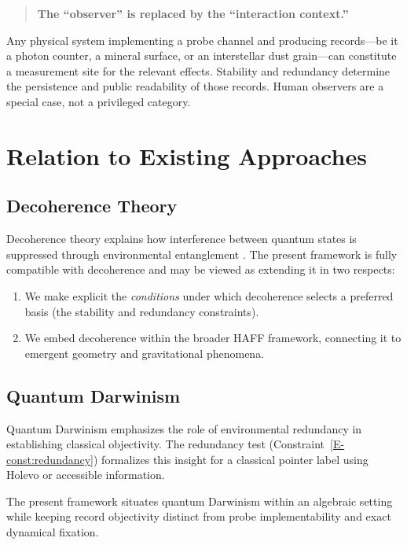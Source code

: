 \documentclass[12pt,a4paper,openany]{book}
\begin{document}
\begin{quote}
\textbf{The ``observer'' is replaced by the ``interaction context.''}
\end{quote}

Any physical system implementing a probe channel and producing records---be it a photon counter, a mineral surface, or an interstellar dust grain---can constitute a measurement site for the relevant effects. Stability and redundancy determine the persistence and public readability of those records. Human observers are a special case, not a privileged category.

\section{Relation to Existing Approaches}
\label{E-sec:relations}

\subsection{Decoherence Theory}

Decoherence theory explains how interference between quantum states is suppressed through environmental entanglement \cite{Zurek2003}. The present framework is fully compatible with decoherence and may be viewed as extending it in two respects:

\begin{enumerate}
    \item We make explicit the \emph{conditions} under which decoherence selects a preferred basis (the stability and redundancy constraints).
    \item We embed decoherence within the broader HAFF framework, connecting it to emergent geometry and gravitational phenomena.
\end{enumerate}

\subsection{Quantum Darwinism}

Quantum Darwinism \cite{Zurek2009} emphasizes the role of environmental redundancy in establishing classical objectivity. The redundancy test (Constraint~\ref{E-const:redundancy}) formalizes this insight for a classical pointer label using Holevo or accessible information.

The present framework situates quantum Darwinism within an algebraic setting while keeping record objectivity distinct from probe implementability and exact dynamical fixation.
\end{document}
